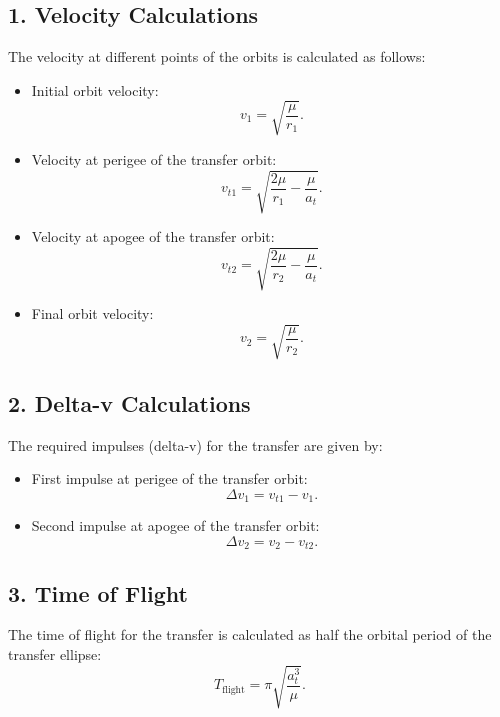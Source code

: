 \documentclass[a4paper,12pt]{article}
\begin{document}
\subsection*{1. Velocity Calculations}
The velocity at different points of the orbits is calculated as follows:
\begin{itemize}
    \item Initial orbit velocity:
    \begin{equation}
        v_1 = \sqrt{\frac{\mu}{r_1}}.
    \end{equation}
    \item Velocity at perigee of the transfer orbit:
    \begin{equation}
        v_{t1} = \sqrt{\frac{2\mu}{r_1} - \frac{\mu}{a_t}}.
    \end{equation}
    \item Velocity at apogee of the transfer orbit:
    \begin{equation}
        v_{t2} = \sqrt{\frac{2\mu}{r_2} - \frac{\mu}{a_t}}.
    \end{equation}
    \item Final orbit velocity:
    \begin{equation}
        v_2 = \sqrt{\frac{\mu}{r_2}}.
    \end{equation}
\end{itemize}

\subsection*{2. Delta-v Calculations}
The required impulses (delta-v) for the transfer are given by:
\begin{itemize}
    \item First impulse at perigee of the transfer orbit:
    \begin{equation}
        \Delta v_1 = v_{t1} - v_1.
    \end{equation}
    \item Second impulse at apogee of the transfer orbit:
    \begin{equation}
        \Delta v_2 = v_2 - v_{t2}.
    \end{equation}
\end{itemize}

\subsection*{3. Time of Flight}
The time of flight for the transfer is calculated as half the orbital period of the transfer ellipse:
\begin{equation}
    T_{\text{flight}} = \pi \sqrt{\frac{a_t^3}{\mu}}.
\end{equation}
\end{document}
